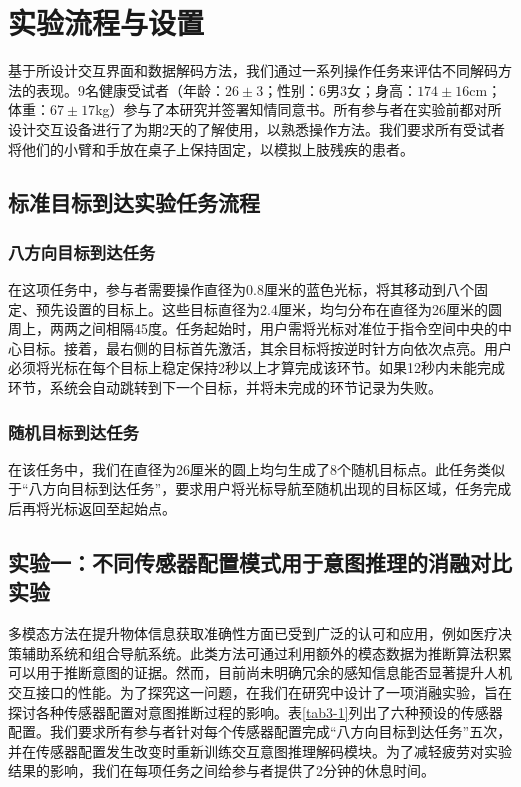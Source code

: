 \section{实验流程与设置}基于所设计交互界面和数据解码方法，我们通过一系列操作任务来评估不同解码方法的表现。9名健康受试者（年龄：$26\pm3$；性别：6男3女；身高：$174\pm16$cm；体重：$67\pm17$kg）参与了本研究并签署知情同意书。所有参与者在实验前都对所设计交互设备进行了为期2天的了解使用，以熟悉操作方法。我们要求所有受试者将他们的小臂和手放在桌子上保持固定，以模拟上肢残疾的患者。

\subsection{标准目标到达实验任务流程}   
    \subsubsection{八方向目标到达任务}在这项任务中，参与者需要操作直径为0.8厘米的蓝色光标，将其移动到八个固定、预先设置的目标上。这些目标直径为2.4厘米，均匀分布在直径为26厘米的圆周上，两两之间相隔45度。任务起始时，用户需将光标对准位于指令空间中央的中心目标。接着，最右侧的目标首先激活，其余目标将按逆时针方向依次点亮。用户必须将光标在每个目标上稳定保持2秒以上才算完成该环节。如果12秒内未能完成环节，系统会自动跳转到下一个目标，并将未完成的环节记录为失败。

   \subsubsection{随机目标到达任务}在该任务中，我们在直径为26厘米的圆上均匀生成了8个随机目标点。此任务类似于“八方向目标到达任务”，要求用户将光标导航至随机出现的目标区域，任务完成后再将光标返回至起始点。

\subsection{实验一：不同传感器配置模式用于意图推理的消融对比实验} 多模态方法在提升物体信息获取准确性方面已受到广泛的认可和应用，例如医疗决策辅助系统和组合导航系统\cite{williamsonContinuousUncertainInteraction2006}。此类方法可通过利用额外的模态数据为推断算法积累可以用于推断意图的证据。然而，目前尚未明确冗余的感知信息能否显著提升人机交互接口的性能。为了探究这一问题，在我们在研究中设计了一项消融实验，旨在探讨各种传感器配置对意图推断过程的影响。表\ref{tab3-1}列出了六种预设的传感器配置。我们要求所有参与者针对每个传感器配置完成``八方向目标到达任务''五次，并在传感器配置发生改变时重新训练交互意图推理解码模块。为了减轻疲劳对实验结果的影响，我们在每项任务之间给参与者提供了2分钟的休息时间。 


